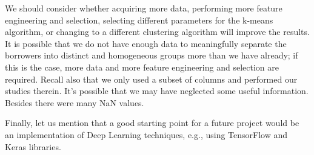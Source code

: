 \documentclass[a4paper,11pt]{amsart}
\begin{document}
\medbreak

We should consider whether acquiring more data, performing more feature engineering and selection, selecting different parameters for the k-means algorithm, or changing to a different clustering algorithm will improve the results. It is possible that we do not have enough data to meaningfully separate the borrowers into distinct and homogeneous groups more than we have already; if this is the case, more data and more feature engineering and selection are required. Recall also that we only used a subset of columns and performed our studies therein. It's possible that we may have neglected some useful information. Besides there were many NaN values. 

\medbreak

Finally, let us mention that a good starting point for a future project would be an implementation of Deep Learning techniques, e.g., using TensorFlow and Keras libraries.
\end{document}
